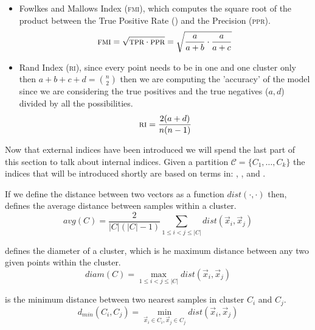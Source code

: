 \begin{itemize}
	\item Fowlkes and Mallows Index (\textsc{fmi})\cite{Fowlkes1983}, which computes the square root of the
		product between the True Positive Rate (\tpr) and the Precision (\textsc{ppr}).
		\begin{equation*}
			\textsc{fmi} = \sqrt{\textsc{tpr} \cdot \textsc{ppr}} = \sqrt{\frac{a}{a + b} \cdot \frac{a}{a + c}}
		\end{equation*}
	\item Rand Index (\textsc{ri})\cite{Rand1971}, since every point needs to be in one and one cluster only
		then $a + b + c + d = \binom{n}{2}$ then we are computing the 'accuracy' of the model
		since we are considering the true positives and the true negatives ($a, d$) divided
		by all the possibilities.
		\begin{equation*}
			\textsc{ri} = \frac{2(a + d)}{n(n - 1)}
		\end{equation*}
\end{itemize}

Now that external indices have been introduced we will spend the last part of this section to talk
about internal indices. Given a partition $\mathcal{C} = \{C_1, \ldots, C_k\}$ the indices that will
be introduced shortly are based on terms in: , ,
 and .

If we define the distance between two vectors as a function $dist(\cdot, \cdot)$ then,  defines the average distance between samples within a cluster.
\begin{equation}
	\label{eq:cluster-avg}
	avg(C) = \frac{2}{|C|(|C| - 1)}\sum_{1 \leq i < j \leq |C|} dist(\vec{x}_i, \vec{x}_j)
\end{equation}

 defines the diameter of a cluster, which is he maximum distance between any
two given points within the cluster.
\begin{equation}
	\label{eq:cluster-diam}
	diam(C) = \max_{1 \leq i < j \leq |C|} dist(\vec{x}_i, \vec{x}_j)
\end{equation}

 is the minimum distance between two nearest samples in cluster
$C_i$ and $C_j$.
\begin{equation}
	\label{eq:inter-cluster-distance}
	d_{min}(C_i, C_j) = \min_{\vec{x}_i \in C_i, \vec{x}_j \in C_j} dist(\vec{x}_i, \vec{x}_j)
\end{equation}

